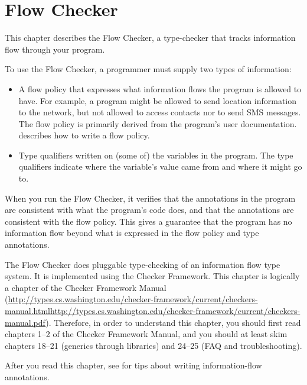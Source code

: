 \htmlhr
\chapter{Flow Checker\label{flow-checker}}

This chapter describes the Flow Checker, a type-checker that 
tracks information flow through your program.

To use the Flow Checker, a programmer must supply two types of
information:

\begin{itemize}
\item
A flow policy that expresses what information flows the program is allowed
to have.   For example, a program might be allowed to send location
information to the network, but not allowed to access contacts nor to send
SMS messages.  The flow policy is primarily derived from the program's user
documentation.   describes how to write a flow
policy.
\item
{}
Type qualifiers written on (some of) the variables in the program.  The
type qualifiers indicate where the variable's value came from and where it
might go to.
\end{itemize}

When you run the Flow Checker, it verifies that the annotations in the
program are consistent with what the program's code does, and that the
annotations are consistent with the flow policy.  This gives a guarantee
that the program has no information flow beyond what is expressed in the
flow policy and type annotations.

The Flow Checker does pluggable type-checking of an information flow type
system.  It is implemented using the Checker Framework.  This chapter is
logically a chapter of the 
Checker Framework Manual (\ifhevea\url{http://types.cs.washington.edu/checker-framework/current/checkers-manual.html}\else\url{http://types.cs.washington.edu/checker-framework/current/checkers-manual.pdf}\fi).
Therefore, in order to understand this chapter, you should first read
chapters 1--2 of the Checker Framework Manual, and you should at least skim
chapters 18--21 (generics through libraries) and 24--25 (FAQ and
troubleshooting). 

After you read this chapter, see  for tips about
writing information-flow annotations.


